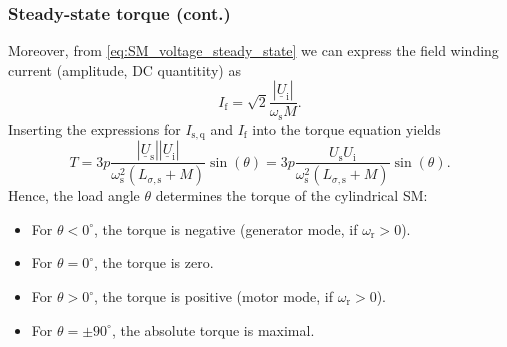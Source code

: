 \begin{frame}
	\frametitle{Steady-state torque (cont.)} 
	Moreover, from \eqref{eq:SM_voltage_steady_state} we can express the field winding current (amplitude, DC quantitity) as
	\begin{equation}
		I_\mathrm{f} = \sqrt{2}\frac{\left|\underline{U}_\mathrm{i}\right|}{\omega_\mathrm{s}M}.
	\end{equation}
	Inserting the expressions for $I_\mathrm{s,q}$ and $I_\mathrm{f}$ into the torque equation yields
	\begin{equation}
		T = 3 p \frac{\left|\underline{U}_\mathrm{s}\right| \left|\underline{U}_\mathrm{i}\right|}{\omega_\mathrm{s}^2 \left(L_{\sigma,\mathrm{s}} + M\right)}  \sin(\theta)  = 3 p \frac{U_\mathrm{s} U_\mathrm{i}}{\omega_\mathrm{s}^2 \left(L_{\sigma,\mathrm{s}} + M\right)}  \sin(\theta). 
		\label{eq:SM_torque_steady_state}
	\end{equation}
	Hence, the load angle $\theta$ determines the torque of the cylindrical SM:
	\begin{itemize}
		\item For $\theta < 0^\circ$, the torque is negative (generator mode, if $\omega_\mathrm{r}>0$).
		\item For $\theta = 0^\circ$, the torque is zero.
		\item For $\theta > 0^\circ$, the torque is positive (motor mode, if $\omega_\mathrm{r}>0$).
		\item For $\theta = \pm 90^\circ$, the absolute torque is maximal.
	\end{itemize}
\end{frame}

